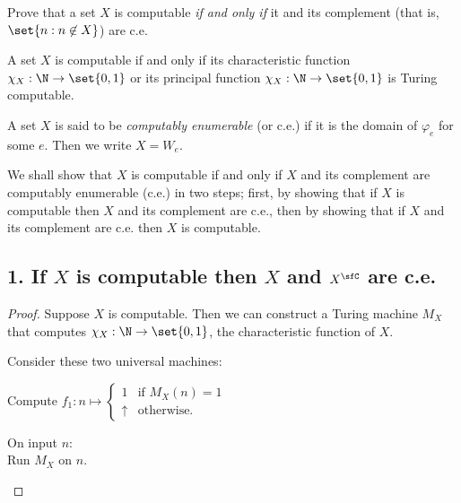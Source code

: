 \begin{problem}
  Prove that a set $X$ is computable \emph{if and only if}
  it and its complement (that is, $\set{n : n \not \in X}$)
  are c.e.

  \begin{answer}
    \begin{definition}
      A set $X$ is computable if and only if its characteristic function $\chi_X : \N \to \set{0, 1}$
      or its principal function $\chi_X : \N \to \set{0, 1}$ is Turing computable.
    \end{definition}

    \begin{definition}
      A set $X$ is said to be \emph{computably enumerable} (or c.e.) if it is the domain
      of $\varphi_e$ for some $e$. Then we write $X = W_e$.
    \end{definition}

    \step
    We shall show that $X$ is computable if and only if
    $X$ and its complement are computably enumerable (c.e.)
    in two steps;
    first, by showing that if $X$ is computable then $X$ and its complement are c.e.,
    then by showing that if $X$ and its complement are c.e. then $X$ is computable.

      \subsection*{1. If $X$ is computable then $X$ and $X^\sfC$ are c.e.}

      \begin{proof}
        Suppose $X$ is computable.
        Then we can construct a Turing machine $M_X$ that computes $\chi_X : \N \to \set{0, 1}$,
        the characteristic function of $X$.

        Consider these two universal machines:

        \begin{algorithm}[H]\label{alg2:X}
          \caption{Compute $f_1 : n \mapsto \begin{cases}
            1 & \text{if } M_X(n) = 1 \\
            \uparrow & \text{otherwise.}
          \end{cases}$}
          On input $n$: \\
          Run $M_X$ on $n$. \\
        \end{algorithm}


\end{proof}
\end{answer}
\end{problem}
